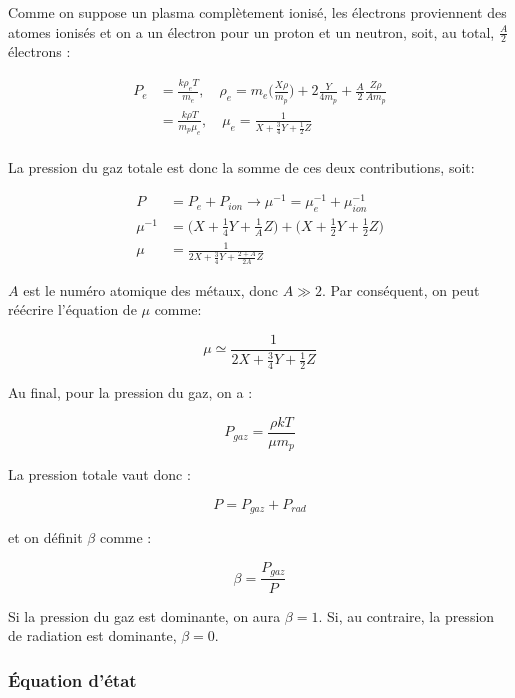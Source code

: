 \documentclass[a4paper,12pt]{article}
\begin{document}
Comme on suppose un plasma complètement ionisé, les électrons proviennent des atomes ionisés et on a un électron pour un proton et un neutron, soit, au total, $\frac{A}{2}$ électrons :

\begin{align*}
        P_{e}& =\frac{k\rho_e T}{m_e}, \quad \rho_e=m_e\big( \frac{X\rho}{m_p}\big) +2\frac{Y}{4m_p} + \frac{A}{2}\frac{Z\rho}{Am_p} \\
        & =\frac{k\rho T}{m_p \mu_{e}}, \quad \mu_e=\frac{1}{X+\frac{3}{4}Y+\frac{1}{2}Z}\\
\end{align*}

La pression du gaz totale est donc la somme de ces deux contributions, soit:


\begin{align*}
    P& = P_e+P_{ion} \xrightarrow{}\mu^{-1}=\mu_e^{-1}+\mu_{ion}^{-1}\\
    \mu^{-1} &=\big( X+\frac{1}{4}Y+\frac{1}{A}Z\big) +\big( X+\frac{1}{2}Y+\frac{1}{2}Z \big)\\
    \mu &= \frac{1}{2X+\frac{3}{4}Y+\frac{2+A}{2A}Z}
\end{align*}


$A$ est le numéro atomique des métaux, donc $A \gg 2$. Par conséquent, on peut réécrire l'équation de $\mu$ comme:

\begin{equation}
    \mu \simeq \frac{1}{2X+\frac{3}{4}Y+\frac{1}{2}Z} 
    \label{mu}
\end{equation}

Au final, pour la pression du gaz, on a : 

\begin{equation}
    P_{gaz}=\frac{\rho k T}{\mu m_p}
\end{equation}

La pression totale vaut donc :

\begin{equation}
    P=P_{gaz}+P_{rad}
\end{equation}

et on définit $\beta$ comme :

\begin{equation}
    \beta=\frac{P_{gaz}}{P}
\end{equation}

Si la pression du gaz est dominante, on aura $\beta=1$. Si, au contraire, la pression de radiation est dominante, $\beta=0$.


\subsubsection{Équation d'état}
\end{document}
